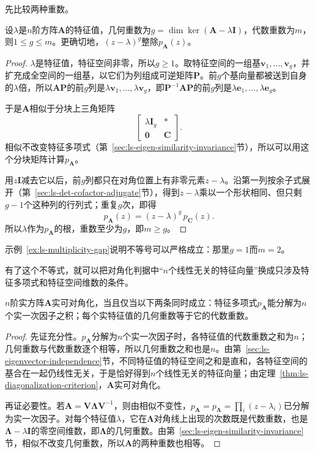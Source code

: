 先比较两种重数。
\begin{theorem}[几何重数不超过代数重数]
\label{thm:ls-geometric-algebraic-multiplicity}
设$\lambda$是$n$阶方阵$\bm A$的特征值，几何重数为$g=\dim\ker(\bm A-\lambda\bm I)$，代数重数为$m$，则$1\leq g\leq m$。更确切地，$(z-\lambda)^g$整除$p_{\bm A}(z)$。
\end{theorem}
\begin{proof}
$\lambda$是特征值，特征空间非零，所以$g\geq1$。取特征空间的一组基$\bm v_1,\ldots,\bm v_g$，并扩充成全空间的一组基，以它们为列组成可逆矩阵$\bm P$。前$g$个基向量都被送到自身的$\lambda$倍，所以$\bm A\bm P$的前$g$列是$\lambda\bm v_1,\ldots,\lambda\bm v_g$，即$\bm P^{-1}\bm A\bm P$的前$g$列是$\lambda\bm e_1,\ldots,\lambda\bm e_g$。

于是$\bm A$相似于分块上三角矩阵
\[
 \begin{bmatrix}\lambda\bm I_g&*\\\bm0&\bm C\end{bmatrix}.
\]
相似不改变特征多项式（第~\ref{sec:ls-eigen-similarity-invariance}节），所以可以用这个分块矩阵计算$p_{\bm A}$。

用$z\bm I$减去它以后，前$g$列都只在对角位置上有非零元素$z-\lambda$。沿第一列按余子式展开（第~\ref{sec:ls-det-cofactor-adjugate}节），得到$z-\lambda$乘以一个形状相同、但只剩$g-1$个这种列的行列式；重复$g$次，即得
\[
 p_{\bm A}(z)=(z-\lambda)^g\,p_{\bm C}(z).
\]
所以$\lambda$作为$p_{\bm A}$的根，重数至少为$g$，即$m\geq g$。
\end{proof}
示例~\ref{ex:ls-multiplicity-gap}说明不等号可以严格成立：那里$g=1$而$m=2$。

有了这个不等式，就可以把对角化判据中“$n$个线性无关的特征向量”换成只涉及特征多项式和特征空间维数的条件。
\begin{theorem}[重数判据]
\label{thm:ls-diagonalization-multiplicity}
$n$阶实方阵$\bm A$实可对角化，当且仅当以下两条同时成立：特征多项式$p_{\bm A}$能分解为$n$个实一次因子之积；每个实特征值的几何重数等于它的代数重数。
\end{theorem}
\begin{proof}
先证充分性。$p_{\bm A}$分解为$n$个实一次因子时，各特征值的代数重数之和为$n$；几何重数与代数重数逐个相等，所以几何重数之和也是$n$。由第~\ref{sec:ls-eigenvector-independence}节，不同特征值的特征空间之和是直和，各特征空间的基合在一起仍线性无关，于是恰好得到$n$个线性无关的特征向量；由定理~\ref{thm:ls-diagonalization-criterion}，$\bm A$实可对角化。

再证必要性。若$\bm A=\bm V\bm\Lambda\bm V^{-1}$，则由相似不变性，$p_{\bm A}=p_{\bm\Lambda}=\prod_i(z-\lambda_i)$已分解为实一次因子。对每个特征值$\lambda$，它在$\bm\Lambda$对角线上出现的次数既是代数重数，也是$\bm\Lambda-\lambda\bm I$的零空间维数，即$\bm\Lambda$的几何重数。由第~\ref{sec:ls-eigen-similarity-invariance}节，相似不改变几何重数，所以$\bm A$的两种重数也相等。
\end{proof}

